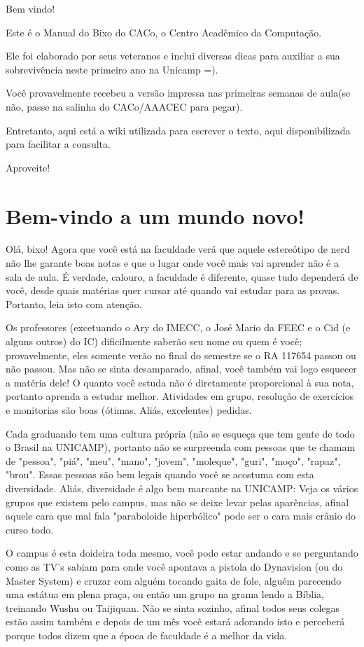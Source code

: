 \documentclass[a4paper,10pt, twocolumn]{article}
\begin{document}
Bem vindo!

Este é o Manual do Bixo do CACo, o Centro Acadêmico da Computação.

Ele foi elaborado por seus veteranos e inclui diversas dicas para auxiliar a sua
sobrevivência neste primeiro ano na Unicamp =).

Você provavelmente recebeu a versão impressa nas primeiras semanas de aula(se
não, passe na salinha do CACo/AAACEC para pegar).

Entretanto, aqui está a wiki utilizada para escrever o texto, aqui
disponibilizada para facilitar a consulta.

Aproveite!

\tableofcontents

\twocolumn
\section{Bem-vindo a um mundo novo!}
Olá, bixo! Agora que você está na faculdade verá que aquele estereótipo de nerd
não lhe garante boas notas e que o lugar onde você mais vai aprender não
é a sala de aula. É verdade, calouro, a faculdade é diferente, quase tudo
dependerá de você, desde quais matérias quer cursar até quando vai estudar para
as provas. Portanto, leia isto com atenção.

Os professores (excetuando o Ary do IMECC, o José Mario da FEEC e o Cid (e alguns outros) do IC)
dificilmente saberão seu nome ou quem é você; provavelmente, eles somente verão
no final do semestre se o RA 117654  passou ou não passou. Mas não se sinta
desamparado, afinal, você também vai logo esquecer a matéria dele! O quanto você
estuda não é diretamente proporcional à sua nota, portanto aprenda a estudar
melhor. Atividades em grupo, resolução de exercícios e monitorias são boas
(ótimas. Aliás, excelentes) pedidas.

Cada graduando tem uma cultura própria (não se esqueça que tem gente de todo
o Brasil na UNICAMP), portanto não se surpreenda com pessoas que te chamam de
"pessoa", "piá", "meu", "mano", "jovem", "moleque", "guri", "moço", "rapaz",
"brou". Essas pessoas são bem legais quando você se acostuma com esta
diversidade. Aliás, diversidade é algo bem marcante na UNICAMP: Veja os vários
grupos que existem pelo campus, mas não se deixe levar pelas aparências, afinal
aquele cara que mal fala "paraboloide hiperbólico" pode ser o cara mais crânio
do curso todo.

O campus é esta doideira toda mesmo, você pode estar andando e se perguntando
como as TV's sabiam para onde você apontava a pistola do Dynavision (ou do
Master System) e cruzar com alguém tocando gaita de fole, alguém parecendo uma
estátua em plena praça, ou então um grupo na grama lendo a Bíblia, treinando
Wushu ou Taijiquan. Não se sinta sozinho, afinal todos seus colegas estão assim
também e depois de um mês você estará adorando isto e perceberá porque todos
dizem que a época de faculdade é a melhor da vida.
\end{document}
